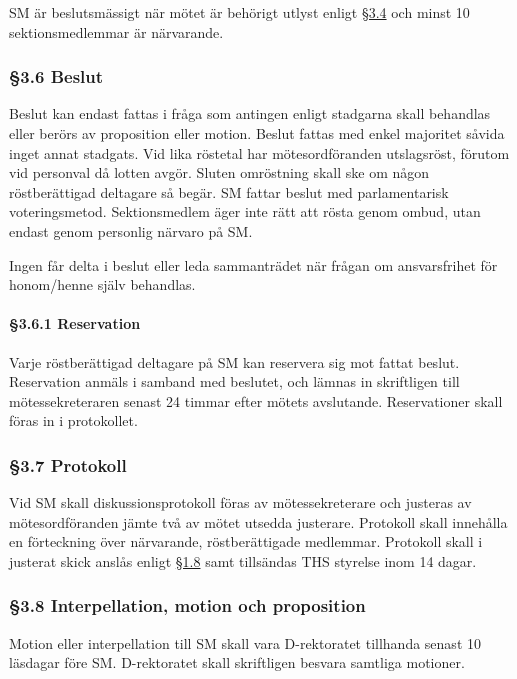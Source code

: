 SM är beslutsmässigt när mötet är behörigt utlyst enligt \href{#kallelse}{§3.4} och minst 10 sektionsmedlemmar är närvarande.

\subsubsection{§3.6 Beslut}

Beslut kan endast fattas i fråga som antingen enligt stadgarna skall behandlas eller berörs av proposition eller motion. Beslut fattas med enkel majoritet såvida inget annat stadgats. Vid lika röstetal har mötesordföranden utslagsröst, förutom vid personval då lotten avgör. Sluten omröstning skall ske om någon röstberättigad deltagare så begär. SM fattar beslut med parlamentarisk voteringsmetod. Sektionsmedlem äger inte rätt att rösta genom ombud, utan endast genom personlig närvaro på SM.

Ingen får delta i beslut eller leda sammanträdet när frågan om ansvarsfrihet för honom/henne själv behandlas.

\paragraph{§3.6.1 Reservation}

Varje röstberättigad deltagare på SM kan reservera sig mot fattat beslut. Reservation anmäls i samband med beslutet, och lämnas in skriftligen till mötessekreteraren senast 24 timmar efter mötets avslutande. Reservationer skall föras in i protokollet.

\subsubsection{§3.7 Protokoll}

Vid SM skall diskussionsprotokoll föras av mötessekreterare och justeras av mötesordföranden jämte två av mötet utsedda justerare. Protokoll skall innehålla en förteckning över närvarande, röstberättigade medlemmar. Protokoll skall i justerat skick anslås enligt \href{#officiella_informationskanaler}{§1.8} samt tillsändas THS styrelse inom 14 dagar.

\subsubsection{§3.8 Interpellation, motion och proposition}

Motion eller interpellation till SM skall vara D-rektoratet tillhanda senast 10 läsdagar före SM. D-rektoratet skall skriftligen besvara samtliga motioner.

